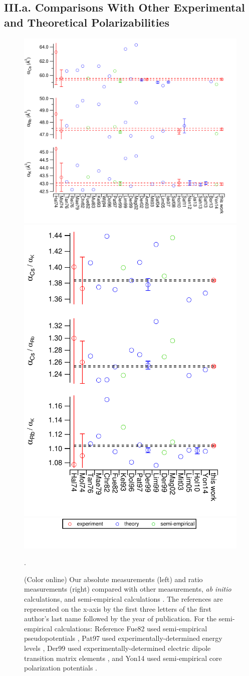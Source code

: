 \documentclass[twocolumn,prl,showpacs,superscriptaddress]{revtex4-1}   %
\begin{document}
\subsection{III.a. Comparisons With Other Experimental and Theoretical Polarizabilities}

\begin{figure}
\includegraphics[width=0.60\linewidth,keepaspectratio]{displayAbsComps.pdf}
\includegraphics[width=0.38\linewidth,keepaspectratio]{displayRatComps.pdf}
\includegraphics[width=0.55\linewidth,keepaspectratio]{displayCompsLegend.pdf}
\caption{\label{comparisons}(Color online) Our absolute measurements (left) and ratio measurements (right) compared with other measurements, \textit{ab initio} calculations, and semi-empirical calculations 
\cite{Molof1974,Hall1974,Tang1976,Reinsch1976,Kutzelnigg1978,
Christiansen1982,Fuentealba1999,Muller1984,Kello1993,VanWijngaarden1994,
Dolg1996,Patil1997,Derevianko1998,Magnier2002,Derevianko2001,
Amini2003,Mitroy2003,Safronova2004,Lim2005,Safronova2008,
Holmgren2010,Safronova2011,Nandy2012,Jiang2013,Sahoo2013,
Safronova2013,Borschevsky2013,Y.-B.2014}.
The references are represented on the x-axis by the first three letters of the first author's last name followed by the year of publication. For the semi-empirical calculations: Reference Fue82 used semi-empirical pseudopotentials \cite{Fuentealba1999}, Pat97 used experimentally-determined energy levels \cite{Patil1997}, Der99 used experimentally-determined electric dipole transition matrix elements \cite{Derevianko1998}, and Yon14 used semi-empirical core polarization potentials \cite{Y.-B.2014}.}.
\end{figure}
\end{document}

